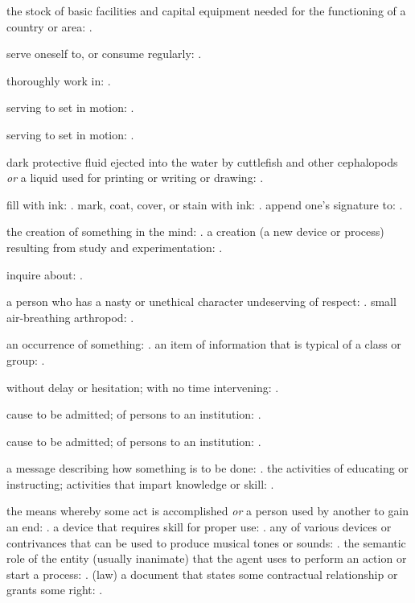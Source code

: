   the stock of basic facilities and capital equipment needed for the functioning of a country or area: .

  serve oneself to, or consume regularly: .

  thoroughly work in: .

  serving to set in motion: .

  serving to set in motion: .

  dark protective fluid ejected into the water by cuttlefish and other cephalopods \textit{or} a liquid used for printing or writing or drawing: .

  fill with ink: . mark, coat, cover, or stain with ink: . append one's signature to: .

  the creation of something in the mind: . a creation (a new device or process) resulting from study and experimentation: .

  inquire about: .

  a person who has a nasty or unethical character undeserving of respect: . small air-breathing arthropod: .

  an occurrence of something: . an item of information that is typical of a class or group: .

  without delay or hesitation; with no time intervening: .

  cause to be admitted; of persons to an institution: .

  cause to be admitted; of persons to an institution: .

  a message describing how something is to be done: . the activities of educating or instructing; activities that impart knowledge or skill: .

  the means whereby some act is accomplished \textit{or} a person used by another to gain an end: . a device that requires skill for proper use: . any of various devices or contrivances that can be used to produce musical tones or sounds: . the semantic role of the entity (usually inanimate) that the agent uses to perform an action or start a process: . (law) a document that states some contractual relationship or grants some right: .

